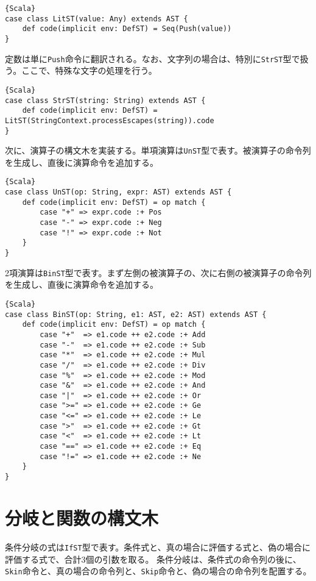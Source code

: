 \documentclass[10pt,a4paper]{book}
\begin{document}
\begin{Verbatim}{Scala}
case class LitST(value: Any) extends AST {
	def code(implicit env: DefST) = Seq(Push(value))
}
\end{Verbatim}

定数は単に\texttt{Push}命令に翻訳される。なお、文字列の場合は、特別に\texttt{StrST}型で扱う。ここで、特殊な文字の処理を行う。

\begin{Verbatim}{Scala}
case class StrST(string: String) extends AST {
	def code(implicit env: DefST) = LitST(StringContext.processEscapes(string)).code
}
\end{Verbatim}

次に、演算子の構文木を実装する。単項演算は\texttt{UnST}型で表す。被演算子の命令列を生成し、直後に演算命令を追加する。

\begin{Verbatim}{Scala}
case class UnST(op: String, expr: AST) extends AST {
	def code(implicit env: DefST) = op match {
		case "+" => expr.code :+ Pos
		case "-" => expr.code :+ Neg
		case "!" => expr.code :+ Not
	}
}
\end{Verbatim}

2項演算は\texttt{BinST}型で表す。まず左側の被演算子の、次に右側の被演算子の命令列を生成し、直後に演算命令を追加する。

\begin{Verbatim}{Scala}
case class BinST(op: String, e1: AST, e2: AST) extends AST {
	def code(implicit env: DefST) = op match {
		case "+"  => e1.code ++ e2.code :+ Add
		case "-"  => e1.code ++ e2.code :+ Sub
		case "*"  => e1.code ++ e2.code :+ Mul
		case "/"  => e1.code ++ e2.code :+ Div
		case "%"  => e1.code ++ e2.code :+ Mod
		case "&"  => e1.code ++ e2.code :+ And
		case "|"  => e1.code ++ e2.code :+ Or
		case ">=" => e1.code ++ e2.code :+ Ge
		case "<=" => e1.code ++ e2.code :+ Le
		case ">"  => e1.code ++ e2.code :+ Gt
		case "<"  => e1.code ++ e2.code :+ Lt
		case "==" => e1.code ++ e2.code :+ Eq
		case "!=" => e1.code ++ e2.code :+ Ne
	}
}
\end{Verbatim}

\section{分岐と関数の構文木\label{sect:CallST}}

条件分岐の式は\texttt{IfST}型で表す。条件式と、真の場合に評価する式と、偽の場合に評価する式で、合計3個の引数を取る。
条件分岐は、条件式の命令列の後に、\texttt{Skin}命令と、真の場合の命令列と、\texttt{Skip}命令と、偽の場合の命令列を配置する。
\end{document}
